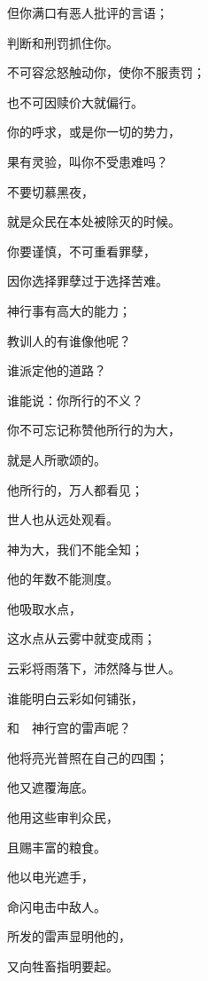 {\par }{\BB \par }{\Q {}但你满口有恶人批评的言语；
\par }{\Q 判断和刑罚抓住你。
\par }{\Q {}不可容忿怒触动你，使你不服责罚；
\par }{\Q 也不可因赎价大就偏行。
\par }{\Q {}你的呼求，或是你一切的势力，
\par }{\Q 果有灵验，叫你不受患难吗？
\par }{\Q {}不要切慕黑夜，
\par }{\Q 就是众民在本处被除灭的时候。
\par }{\Q {}你要谨慎，不可重看罪孽，
\par }{\Q 因你选择罪孽过于选择苦难。
\par }{\Q {}神行事有高大的能力；
\par }{\Q 教训人的有谁像他呢？
\par }{\Q {}谁派定他的道路？
\par }{\Q 谁能说：你所行的不义？
\par }{\BB \par }{\Q {}你不可忘记称赞他所行的为大，
\par }{\Q 就是人所歌颂的。
\par }{\Q {}他所行的，万人都看见；
\par }{\Q 世人也从远处观看。
\par }{\Q {}神为大，我们不能全知；
\par }{\Q 他的年数不能测度。
\par }{\Q {}他吸取水点，
\par }{\Q 这水点从云雾中就变成雨；
\par }{\Q {}云彩将雨落下，沛然降与世人。
\par }{\Q {}谁能明白云彩如何铺张，
\par }{\Q 和　神行宫的雷声呢？
\par }{\Q {}他将亮光普照在自己的四围；
\par }{\Q 他又遮覆海底。
\par }{\Q {}他用这些审判众民，
\par }{\Q 且赐丰富的粮食。
\par }{\Q {}他以电光遮手，
\par }{\Q 命闪电击中敌人。
\par }{\Q {}所发的雷声显明他的{}，
\par }{\Q 又向牲畜指明要起{}。

}
